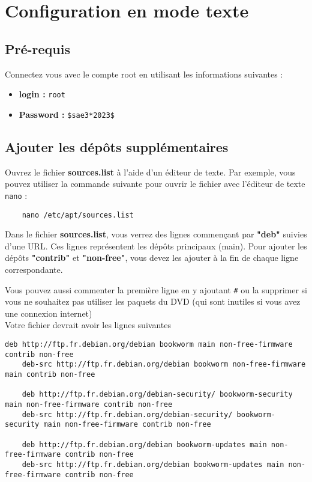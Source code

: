 \chapter{Configuration en mode texte}

\section{Pré-requis}
Connectez vous avec le compte root en utilisant les informations suivantes :
\begin{itemize}
	\item \textbf{login :} \texttt{root}
	\item \textbf{Password :} \texttt{\$sae3*2023\$}
\end{itemize}

\section{Ajouter les dépôts supplémentaires}
Ouvrez le fichier \textbf{sources.list} à l'aide d'un éditeur de texte. Par exemple, vous pouvez utiliser la commande suivante pour ouvrir le fichier avec l'éditeur de texte \texttt{nano} :
\begin{lstlisting}
	nano /etc/apt/sources.list
\end{lstlisting}

Dans le fichier \textbf{sources.list}, vous verrez des lignes commençant par \textbf{"deb"} suivies d'une URL. Ces lignes représentent les dépôts principaux (main). Pour ajouter les dépôts \textbf{"contrib"} et \textbf{"non-free"}, vous devez les ajouter à la fin de chaque ligne correspondante.

Vous pouvez aussi commenter la première ligne en y ajoutant \texttt{\#} ou la supprimer si vous ne souhaitez pas utiliser les paquets du DVD (qui sont inutiles si vous avez une connexion internet)\\

Votre fichier devrait avoir les lignes suivantes
\begin{lstlisting}[style=tf]
	deb http://ftp.fr.debian.org/debian bookworm main non-free-firmware contrib non-free
	deb-src http://ftp.fr.debian.org/debian bookworm non-free-firmware main contrib non-free
	
	deb http://ftp.fr.debian.org/debian-security/ bookworm-security main non-free-firmware contrib non-free
	deb-src http://ftp.fr.debian.org/debian-security/ bookworm-security main non-free-firmware contrib non-free
	
	deb http://ftp.fr.debian.org/debian bookworm-updates main non-free-firmware contrib non-free
	deb-src http://ftp.fr.debian.org/debian bookworm-updates main non-free-firmware contrib non-free
\end{lstlisting}

